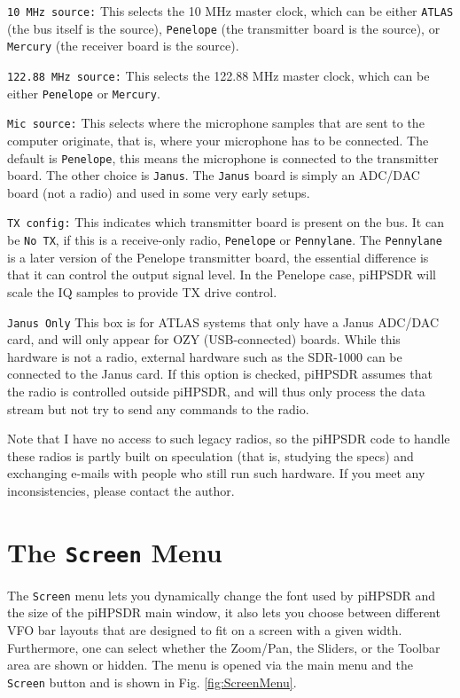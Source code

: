\documentclass[12pt]{book}
\def\rett#1{\texttt{\color{red}#1}}
\def\bltt#1{\texttt{\color{blue}#1}}
\def\pH{pi\-HPSDR\xspace}
\begin{document}
\rett{10 MHz source:} This selects the 10 MHz master clock, which can be either \texttt{ATLAS}
(the bus itself is the source), \texttt{Penelope} (the transmitter board is the source),
or \texttt{Mercury} (the receiver board is the source).

\rett{122.88 MHz source:} This selects the 122.88 MHz master clock, which can be either
\texttt{Penelope} or \texttt{Mercury}.

\rett{Mic source:} This selects where the microphone samples that are sent to the computer
originate, that is, where your microphone has to be connected. The default is
\texttt{Penelope}, this means the microphone is connected to the transmitter board. The
other choice is \texttt{Janus}. The \texttt{Janus} board is simply an ADC/DAC board (not
a radio) and used in some very early setups.

\rett{TX config:} This indicates which transmitter board is present on the bus. It can
be \texttt{No TX}, if this is a receive-only radio, \texttt{Penelope} or \texttt{Pennylane}.
The \texttt{Pennylane} is a later version of the Penelope transmitter board, the essential
difference is that it can control the output signal level. In the Penelope case,
\pH will scale the IQ samples to provide TX drive control.

\rett{Janus Only} This box is for ATLAS systems that only have a Janus ADC/DAC card,
and will only appear for OZY (USB-connected) boards. While this hardware is not a radio,
external hardware such as the SDR-1000 can be connected to the Janus card. If this
option is checked, \pH assumes that the radio is controlled outside \pH, and
will thus only process the data stream but not try to send any commands to the radio.

Note that I have no access to such legacy radios, so the \pH code to handle these radios
is partly built on speculation (that is, studying the specs) and exchanging e-mails with
people who still run such hardware. If you meet any inconsistencies, please contact
the author.

\section{The \texttt{Screen} Menu}

The \bltt{Screen} menu lets you dynamically change the font used by \pH and
the size of the \pH main
window, it also lets you choose between different VFO bar layouts that are designed to fit
on a screen with a given width. Furthermore, one
can select whether the Zoom/Pan, the Sliders, or the Toolbar area are shown or hidden.
 The menu is opened
via the main menu and the \bltt{Screen} button and is shown in Fig. \ref{fig:ScreenMenu}.
\end{document}
